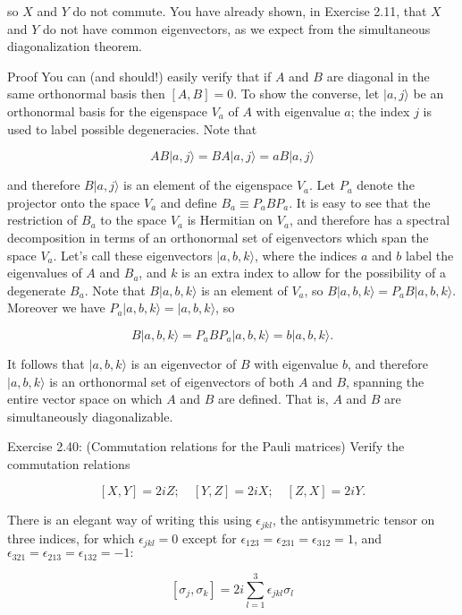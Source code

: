 so $X$ and $Y$ do not commute. You have already shown, in Exercise 2.11, that $X$ and $Y$ do not have common eigenvectors, as we expect from the simultaneous diagonalization theorem.

Proof
You can (and should!) easily verify that if $A$ and $B$ are diagonal in the same orthonormal basis then $[A, B]=0$. To show the converse, let $|a, j\rangle$ be an orthonormal basis for the eigenspace $V_{a}$ of $A$ with eigenvalue $a$; the index $j$ is used to label possible degeneracies. Note that

$$
A B|a, j\rangle=B A|a, j\rangle=a B|a, j\rangle
$$

and therefore $B|a, j\rangle$ is an element of the eigenspace $V_{a}$. Let $P_{a}$ denote the projector onto the space $V_{a}$ and define $B_{a} \equiv P_{a} B P_{a}$. It is easy to see that the restriction of $B_{a}$ to the space $V_{a}$ is Hermitian on $V_{a}$, and therefore has a spectral decomposition in terms of an orthonormal set of eigenvectors which span the space $V_{a}$. Let's call these eigenvectors $|a, b, k\rangle$, where the indices $a$ and $b$ label the eigenvalues of $A$ and $B_{a}$, and $k$ is an extra index to allow for the possibility of a degenerate $B_{a}$. Note that $B|a, b, k\rangle$ is an element of $V_{a}$, so $B|a, b, k\rangle=P_{a} B|a, b, k\rangle$. Moreover we have $P_{a}|a, b, k\rangle=|a, b, k\rangle$, so

$$
B|a, b, k\rangle=P_{a} B P_{a}|a, b, k\rangle=b|a, b, k\rangle .
$$

It follows that $|a, b, k\rangle$ is an eigenvector of $B$ with eigenvalue $b$, and therefore $|a, b, k\rangle$ is an orthonormal set of eigenvectors of both $A$ and $B$, spanning the entire vector space on which $A$ and $B$ are defined. That is, $A$ and $B$ are simultaneously diagonalizable.

Exercise 2.40: (Commutation relations for the Pauli matrices) Verify the commutation relations

$$
[X, Y]=2 i Z ; \quad[Y, Z]=2 i X ; \quad[Z, X]=2 i Y .
$$

There is an elegant way of writing this using $\epsilon_{j k l}$, the antisymmetric tensor on\\
three indices, for which $\epsilon_{j k l}=0$ except for $\epsilon_{123}=\epsilon_{231}=\epsilon_{312}=1$, and $\epsilon_{321}=\epsilon_{213}=\epsilon_{132}=-1:$

$$
\left[\sigma_{j}, \sigma_{k}\right]=2 i \sum_{l=1}^{3} \epsilon_{j k l} \sigma_{l}
$$

